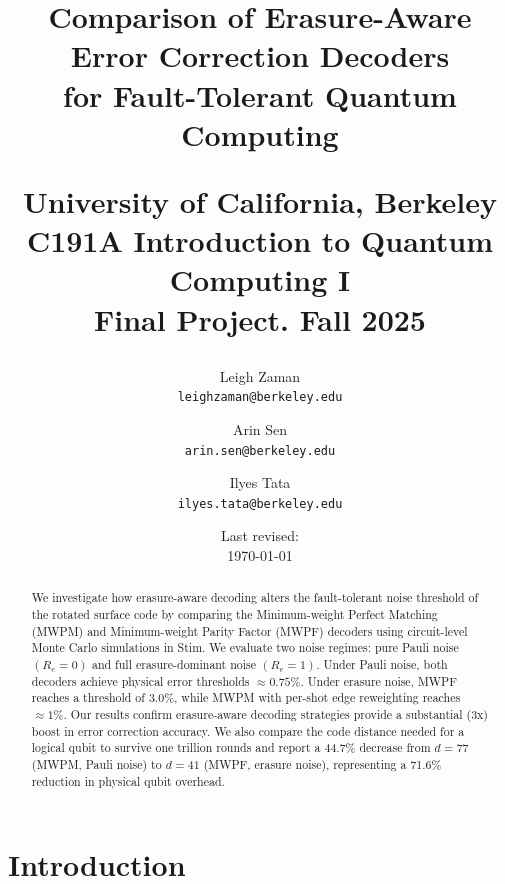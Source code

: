 \documentclass[11pt, notitlepage, letterpaper]{article}
\begin{document}
\title{\LARGE{Comparison of Erasure-Aware Error Correction Decoders \\ for Fault-Tolerant Quantum Computing \\}

    \large{University of California, Berkeley\\C191A  Introduction to Quantum Computing I}\\
    Final Project. Fall 2025\\}

\author{Leigh Zaman\\ \texttt{leighzaman@berkeley.edu}
    \and Arin Sen \\ \texttt{arin.sen@berkeley.edu}
    \and Ilyes Tata \\ \texttt{ilyes.tata@berkeley.edu}
}
\date{Last revised:\\ \today}
\maketitle

\begin{abstract}
    We investigate how erasure-aware decoding alters the fault-tolerant noise threshold of the rotated surface code by comparing the Minimum-weight Perfect Matching (MWPM) and Minimum-weight Parity Factor (MWPF) decoders using circuit-level Monte Carlo simulations in Stim. We evaluate two noise regimes: pure Pauli noise $(R_e = 0)$ and full erasure-dominant noise $(R_e = 1)$. Under Pauli noise, both decoders achieve physical error thresholds $\approx 0.75\%$. Under erasure noise, MWPF reaches a threshold of $3.0\%$, while MWPM with per-shot edge reweighting reaches $\approx 1\%$. Our results confirm erasure-aware decoding strategies provide a substantial (3x) boost in error correction accuracy. We also compare the code distance needed for a logical qubit to survive one trillion rounds and report a 44.7\% decrease from $d=77$ (MWPM, Pauli noise) to $d=41$ (MWPF, erasure noise), representing a 71.6\% reduction in physical qubit overhead.
\end{abstract}
\newpage
\tableofcontents

\newpage
\section{Introduction}
\label{sec:intro}
\end{document}
